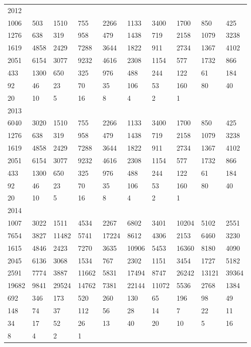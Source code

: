\begin{longtable}{*{10}{l}}
2012&&&&&&&&&\\
1006& 503& 1510& 755& 2266& 1133& 3400& 1700& 850& 425\\
1276& 638& 319& 958& 479& 1438& 719& 2158& 1079& 3238\\
1619& 4858& 2429& 7288& 3644& 1822& 911& 2734& 1367& 4102\\
2051& 6154& 3077& 9232& 4616& 2308& 1154& 577& 1732& 866\\
433& 1300& 650& 325& 976& 488& 244& 122& 61& 184\\
92& 46& 23& 70& 35& 106& 53& 160& 80& 40\\
20& 10& 5& 16& 8& 4& 2& 1& \\

2013&&&&&&&&&\\
6040& 3020& 1510& 755& 2266& 1133& 3400& 1700& 850& 425\\
1276& 638& 319& 958& 479& 1438& 719& 2158& 1079& 3238\\
1619& 4858& 2429& 7288& 3644& 1822& 911& 2734& 1367& 4102\\
2051& 6154& 3077& 9232& 4616& 2308& 1154& 577& 1732& 866\\
433& 1300& 650& 325& 976& 488& 244& 122& 61& 184\\
92& 46& 23& 70& 35& 106& 53& 160& 80& 40\\
20& 10& 5& 16& 8& 4& 2& 1& \\

2014&&&&&&&&&\\
1007& 3022& 1511& 4534& 2267& 6802& 3401& 10204& 5102& 2551\\
7654& 3827& 11482& 5741& 17224& 8612& 4306& 2153& 6460& 3230\\
1615& 4846& 2423& 7270& 3635& 10906& 5453& 16360& 8180& 4090\\
2045& 6136& 3068& 1534& 767& 2302& 1151& 3454& 1727& 5182\\
2591& 7774& 3887& 11662& 5831& 17494& 8747& 26242& 13121& 39364\\
19682& 9841& 29524& 14762& 7381& 22144& 11072& 5536& 2768& 1384\\
692& 346& 173& 520& 260& 130& 65& 196& 98& 49\\
148& 74& 37& 112& 56& 28& 14& 7& 22& 11\\
34& 17& 52& 26& 13& 40& 20& 10& 5& 16\\
8& 4& 2& 1& \\


\end{longtable}
